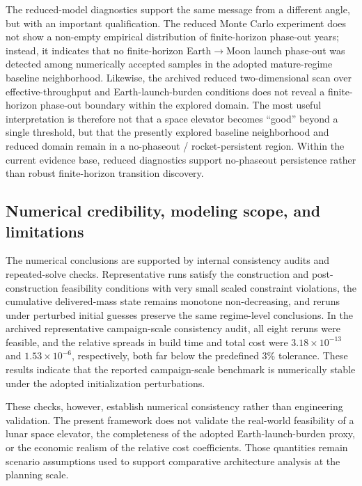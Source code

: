 \documentclass[12pt]{article}
\begin{document}
The reduced-model diagnostics support the same message from a different angle, but with an important qualification. The reduced Monte Carlo experiment does not show a non-empty empirical distribution of finite-horizon phase-out years; instead, it indicates that no finite-horizon Earth$\to$Moon launch phase-out was detected among numerically accepted samples in the adopted mature-regime baseline neighborhood. Likewise, the archived reduced two-dimensional scan over effective-throughput and Earth-launch-burden conditions does not reveal a finite-horizon phase-out boundary within the explored domain. The most useful interpretation is therefore not that a space elevator becomes ``good'' beyond a single threshold, but that the presently explored baseline neighborhood and reduced domain remain in a no-phaseout / rocket-persistent region. Within the current evidence base, reduced diagnostics support no-phaseout persistence rather than robust finite-horizon transition discovery.

\subsection{Numerical credibility, modeling scope, and limitations}
\label{subsec:discussion_scope}

The numerical conclusions are supported by internal consistency audits and repeated-solve checks. Representative runs satisfy the construction and post-construction feasibility conditions with very small scaled constraint violations, the cumulative delivered-mass state remains monotone non-decreasing, and reruns under perturbed initial guesses preserve the same regime-level conclusions. In the archived representative campaign-scale consistency audit, all eight reruns were feasible, and the relative spreads in build time and total cost were \(3.18\times 10^{-13}\) and \(1.53\times 10^{-6}\), respectively, both far below the predefined 3\% tolerance. These results indicate that the reported campaign-scale benchmark is numerically stable under the adopted initialization perturbations.

These checks, however, establish numerical consistency rather than engineering validation. The present framework does not validate the real-world feasibility of a lunar space elevator, the completeness of the adopted Earth-launch-burden proxy, or the economic realism of the relative cost coefficients. Those quantities remain scenario assumptions used to support comparative architecture analysis at the planning scale.
\end{document}
